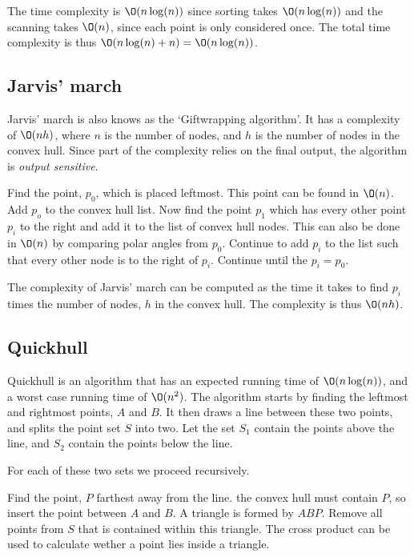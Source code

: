 \documentclass[10pt]{article}
\begin{document}
The time complexity is $\O(n\log(n))$ since sorting takes $\O(n\log(n))$ and the scanning takes $\O(n)$, since each point is only considered once. The total time complexity is thus $\O(n\log(n)+n)=\O(n\log(n))$.


\subsection{Jarvis' march} %
\label{sub:jarvis_march}
Jarvis' march is also knows as the `Giftwrapping algorithm'. It has a complexity of $\O(nh)$, where $n$ is the number of nodes, and $h$ is the number of nodes in the convex hull. Since part of the complexity relies on the final output, the algorithm is \emph{output sensitive}.

Find the point, $p_0$, which is placed leftmost. This point can be found in $\O(n)$. Add $p_o$ to the convex hull list. Now find the point $p_1$ which has every other point $p_i$ to the right and add it to the list of convex hull nodes. This can also be done in $\O(n)$ by comparing polar angles from $p_0$. Continue to add $p_i$ to the list such that every other node is to the right of $p_i$. Continue until the $p_i=p_0$.

The complexity of Jarvis' march can be computed as the time it takes to find $p_i$ times the number of nodes, $h$ in the convex hull. The complexity is thus $\O(nh)$.


\subsection{Quickhull} %
\label{sub:quickhull}
Quickhull is an algorithm that has an expected running time of $\O(n\log(n))$, and a worst case running time of $\O(n^2)$. The algorithm starts by finding the leftmost and rightmost points, $A$ and $B$. It then draws a line between these two points, and splits the point set $S$ into two. Let the set $S_1$ contain the points above the line, and $S_2$ contain the points below the line. 

For each of these two sets we proceed recursively.

Find the point, $P$ farthest away from the line. the convex hull must contain $P$, so insert the point between $A$ and $B$. A triangle is formed by $ABP$. Remove all points from $S$ that is contained within this triangle. The cross product can be used to calculate wether a point lies inside a triangle.                                                                                        
\end{document}

